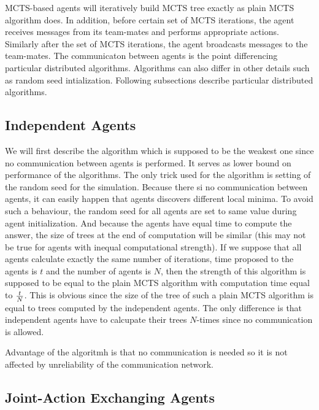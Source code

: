MCTS-based agents will iteratively build MCTS tree exactly as plain MCTS algorithm does. In
addition, before certain set of MCTS iterations, the agent receives messages from its team-mates
and performs appropriate actions. Similarly after the set of MCTS iterations, the agent
broadcasts messages to the team-mates. The communicaton between agents is the point differencing
particular distributed algorithms. Algorithms can also differ in other details such as random
seed intialization. Following subsections describe particular distributed algorithms.


\subsection{Independent Agents}


We will first describe the algorithm which is supposed to be the weakest one since no
communication between agents is performed. It serves as lower bound on performance of the
algorithms. The only trick used for the algorithm is setting of the random seed for the
simulation. Because there si no communication between agents, it can easily happen that agents
discovers different local minima. To avoid such a behaviour, the random seed for all agents are
set to same value during agent initialization. And because the agents have equal time to
compute the answer, the size of trees at the end of computation will be similar (this may not
be true for agents with inequal computational strength). If we suppose that all agents
calculate exactly the same number of iterations, time proposed to the agents is $t$ and the 
number of agents is $N$, then the
strength of this algorithm is supposed to be equal to the plain MCTS algorithm with computation
time equal to $t \over N$. This is obvious since the size of the tree of such a plain MCTS
algorithm is equal to trees computed by the independent agents. The only difference is that
independent agents have to calcupate their trees $N$-times since no communication is allowed.

Advantage of the algoritmh is that no communication is needed so it is not affected by
unreliability of the communication network.



\subsection{Joint-Action Exchanging Agents}

